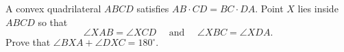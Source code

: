 A convex quadrilateral $ABCD$ satisfies $AB\cdot CD = BC\cdot DA$. Point $X$ lies inside $ABCD$ so that \[\angle{XAB} = \angle{XCD}\quad\,\,\text{and}\quad\,\,\angle{XBC} = \angle{XDA}.\]Prove that $\angle{BXA} + \angle{DXC} = 180^\circ$.